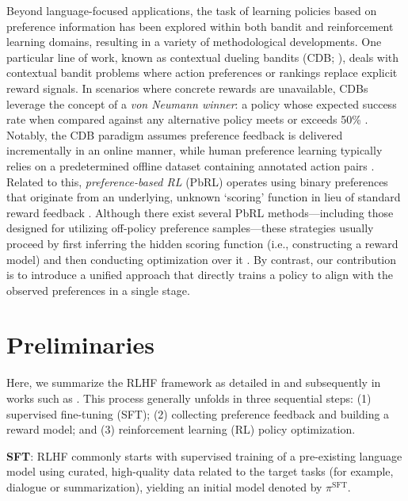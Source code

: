 Beyond language-focused applications, the task of learning policies based on preference information has been explored within both bandit and reinforcement learning domains, resulting in a variety of methodological developments. One particular line of work, known as contextual dueling bandits (CDB; \cite{yue2012karmed,dudik2015contextual}), deals with contextual bandit problems where action preferences or rankings replace explicit reward signals. In scenarios where concrete rewards are unavailable, CDBs leverage the concept of a \textit{von Neumann winner}: a policy whose expected success rate when compared against any alternative policy meets or exceeds 50\% \citep{dudik2015contextual}. Notably, the CDB paradigm assumes preference feedback is delivered incrementally in an online manner, while human preference learning typically relies on a predetermined offline dataset containing annotated action pairs \citep{yan2022human}. Related to this, \textit{preference-based RL} (PbRL) operates using binary preferences that originate from an underlying, unknown `scoring' function in lieu of standard reward feedback \citep{BusaFekete2014,ruiz2023dueling}. Although there exist several PbRL methods—including those designed for utilizing off-policy preference samples—these strategies usually proceed by first inferring the hidden scoring function (i.e., constructing a reward model) and then conducting optimization over it \citep{jain2013learning,BusaFekete2014,christiano2017deep,sadigh2017active,kupcsik2018learning}. By contrast, our contribution is to introduce a unified approach that directly trains a policy to align with the observed preferences in a single stage.

\section{Preliminaries}\label{section:prelims}

Here, we summarize the RLHF framework as detailed in \citeauthor{ziegler2020finetuning} and subsequently in works such as \citep{stiennon2022learning, bai2022training, ouyang2022training}. This process generally unfolds in three sequential steps: (1) supervised fine-tuning (SFT); (2) collecting preference feedback and building a reward model; and (3) reinforcement learning (RL) policy optimization.

\textbf{SFT}: RLHF commonly starts with supervised training of a pre-existing language model using curated, high-quality data related to the target tasks (for example, dialogue or summarization), yielding an initial model denoted by $\pi^\text{SFT}$.

